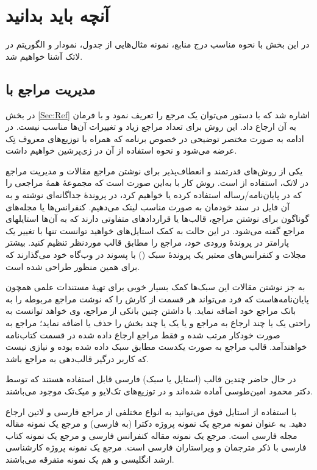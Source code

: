 \chapter{آنچه باید بدانید}\label{App:App1}
در این بخش با نحوه مناسب درج منابع، نمونه مثال‌هایی از جدول، نمودار و الگوریتم در لاتک  آشنا خواهیم شد.



\section{ مدیریت مراجع با \texorpdfstring{}{Bib\TeX} }
در بخش \ref{Sec:Ref} اشاره شد که با دستور  
  می‌توان یک مرجع را تعریف نمود و با فرمان 
  به آن ارجاع داد. این روش برای تعداد مراجع زیاد و تغییرات آن‌ها مناسب نیست. در ادامه به صورت مختصر توضیحی در خصوص برنامه  که همراه با توزیع‌های معروف تِک عرضه می‌شود و نحوه استفاده از آن در زی‌پرشین خواهیم داشت.
  
یکی از روش‌های قدرتمند و انعطاف‌پذیر برای نوشتن مراجع مقالات و مدیریت مراجع در لاتک، استفاده از   
 است.  روش کار با   به‌این صورت است که مجموعهٔ همه‌ٔ مراجعی را که در پایان‌نامه/رساله استفاده کرده یا خواهیم کرد، 
در پروندهٔ جداگانه‌ای نوشته و به آن فایل در سند خودمان به صورت مناسب لینک می‌دهیم.
 کنفرانس‌ها یا مجله‌های گوناگون برای نوشتن مراجع، قالب‌ها یا قراردادهای متفاوتی دارند که به آن‌ها استایلهای مراجع گفته می‌شود.
 در این حالت به کمک ‌استایل‌های  خواهید توانست تنها با تغییر یک پارامتر در پروندهٔ ورودی خود، مراجع را مطابق قالب موردنظر تنظیم کنید. 
 بیشتر مجلات و کنفرانس‌های معتبر یک پروندهٔ سبک () با پسوند  در وب‌گاه خود می‌گذارند که برای همین منظور طراحی شده است.

به جز نوشتن مقالات این سبک‌ها کمک بسیار خوبی برای تهیهٔ مستندات علمی همچون پایان‌نامه‌هاست که فرد می‌تواند هر قسمت از کارش را که نوشت مراجع مربوطه را به بانک مراجع خود اضافه نماید. با داشتن چنین بانکی از مراجع، وی خواهد توانست به راحتی یک یا چند ارجاع به مراجع و یا یک یا چند بخش را حذف یا اضافه ‌نماید؛ 
مراجع به صورت خودکار مرتب شده و فقط مراجع ارجاع داده شده در قسمت کتاب‌نامه خواهندآمد. قالب مراجع به صورت یکدست مطابق سبک داده شده بوده و نیازی نیست که کاربر درگیر قالب‌دهی به مراجع باشد. 

در حال حاضر چندین قالب (استایل یا سبک) فارسی قابل استفاده هستند که توسط دکتر محمود امین‌طوسی آماده شده‌اند و در توزیع‌های تک‌لایو 
و میک‌تک موجود می‌باشند. 

با استفاده از استایل فوق می‌توانید به انواع مختلفی از مراجع فارسی و لاتین ارجاع دهید. به عنوان نمونه مرجع 
\cite{Omidali82phdThesis}
 یک نمونه پروژه دکترا (به فارسی) و مرجع 
\cite{Vahedi87} یک نمونه مقاله مجله فارسی است.
مرجع 
\cite{Amintoosi87afzayesh}  یک نمونه  مقاله کنفرانس فارسی و
مرجع 
\cite{Pedram80osool} یک نمونه کتاب فارسی با ذکر مترجمان و ویراستاران فارسی است. مرجع 
\cite{Khalighi07MscThesis} یک نمونه پروژه کارشناسی ارشد انگلیسی و
\cite{xepersian} هم یک نمونه متفرقه  می‌باشند.

